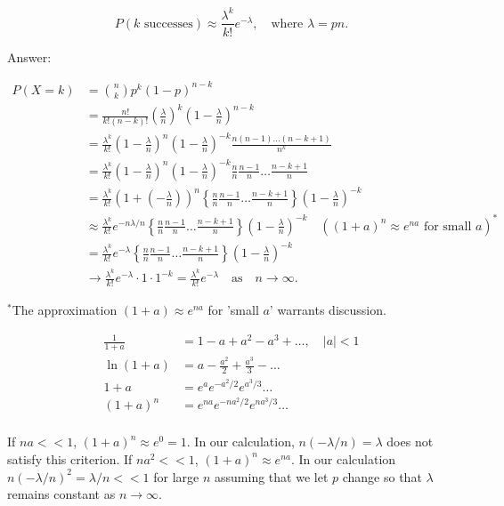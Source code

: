 \documentclass{article}
\begin{document}
{$$
P(k \text{ successes}) \approx \frac{\lambda^k}{k!}e^{-\lambda}, \quad \text{where } \lambda = pn.
$$

Answer:


\begin{align*}
P(X = k) &= \binom{n}{k}p^k(1-p)^{n-k} \\
&= \frac{n!}{k!(n-k)!}\left(\frac{\lambda}{n}\right)^k \left(1 -\frac{\lambda}{n}\right)^{n-k} \\
&= \frac{\lambda^k}{k!}\left(1-\frac{\lambda}{n}\right)^n\left(1-\frac{\lambda}{n}\right)^{-k}\frac{n(n-1)\dots (n-k+1)}{n^k} \\
&= \frac{\lambda^k}{k!}\left(1-\frac{\lambda}{n}\right)^n\left(1-\frac{\lambda}{n}\right)^{-k}\frac{n}{n}\frac{n-1}{n} \dots \frac{n-k+1}{n} \\
&= \frac{\lambda^k}{k!}\left(1 + \left(-\frac{\lambda}{n}\right)\right)^n\left\lbrace\frac{n}{n}\frac{n-1}{n} \dots \frac{n-k+1}{n}\right\rbrace \left(1-\frac{\lambda}{n}\right)^{-k}\\
&\approx \frac{\lambda^k}{k!}e^{-n\lambda / n} \left\lbrace\frac{n}{n}\frac{n-1}{n} \dots \frac{n-k+1}{n}\right\rbrace \left(1-\frac{\lambda}{n}\right)^{-k} \quad ((1+a)^n \approx e^{na} \text{ for small } a)^* \\
&= \frac{\lambda^k}{k!}e^{-\lambda} \left\lbrace\frac{n}{n}\frac{n-1}{n} \dots \frac{n-k+1}{n}\right\rbrace \left(1-\frac{\lambda}{n}\right)^{-k}\\
&\rightarrow \frac{\lambda^k}{k!}e^{-\lambda} \cdot 1 \cdot  1^{-k} = \frac{\lambda^k}{k!}e^{-\lambda} \quad \text{as} \quad n \rightarrow \infty.
\end{align*}

$^*$The approximation $(1+a) \approx e^{na}$ for 'small $a$' warrants discussion.

\begin{align*}
\frac{1}{1+a} &= 1 - a + a^2 - a^3 + \dots, \quad |a| < 1\\
\ln (1+a) &= a - \frac{a^2}{2} + \frac{a^3}{3} - \dots \\
1+a &= e^ae^{-a^2/2}e^{a^3/3}\dots \\
(1+a)^n &= e^{na}e^{-na^2/2}e^{na^3/3}\dots \\
\end{align*}

If $na << 1$, $(1+a)^n \approx e^0 = 1$. In our calculation, $n(-\lambda / n) = \lambda$ does not satisfy this criterion. If $na^2 <<1$, $(1+a)^n \approx e^{na}$. In our calculation $n(-\lambda / n)^2 = \lambda / n << 1$ for large $n$ assuming that we let $p$ change so that $\lambda$ remains constant as $n \rightarrow \infty$. 

}
\end{document}
